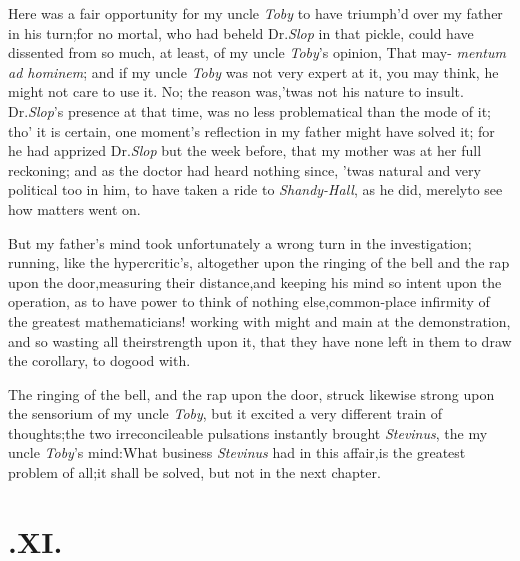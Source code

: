 \documentclass{article}
\begin{document}
Here was a fair opportunity for my uncle
\textit{Toby} to have triumph’d over my
father in his turn;\tsk for no mortal,
who had beheld Dr.\@ \textit{Slop} in
that pickle, could have dissented from
so much, at least, of my uncle
\textit{Toby}’s opinion, \lqq That may-\break
{}
\textit{mentum ad hominem}; and if my uncle
\textit{Toby} was not very expert at it,
you may think, he might not care to use
it.\tsk\break
No; the reason was,\tsk ’twas not his nature to insult.\\
\newpage
Dr.\@ \textit{Slop}’s presence at that time, was no less
problematical than the mode of it; tho’ it is certain, one
moment’s reflection in my father might have solved it; for he
had apprized Dr.\@ \textit{Slop} but the week before, that my mother was at her full reckoning;
and as the doctor had heard nothing since, ’twas natural and
very political too in him, to have taken a ride to
\textit{Shandy-Hall}, as he did, merely\break to see how matters went
on.

But my father’s mind took unfortunately a wrong turn in
the investigation; running, like the hypercritic’s,
altogether upon the ringing of the bell and the rap upon the
door,\tsk measuring their distance,\tsk and keeping his mind so
intent upon the operation, as to have power to think of nothing
else,\tsh common-place infirmity of the greatest
mathematicians! working with might and main at the
de\-monstration,
and so wasting all their\break strength upon it, that they have none left
in them to draw the corollary, to do\break good with.

The ringing of the bell, and the rap upon the door, struck
likewise strong\break
upon the sensorium of my uncle \textit{Toby},\tsk\break 
but it excited a very different train of
thoughts;\tsk the two irreconcileable pulsations instantly
brought \textit{Stevinus}, the\break
{}
my uncle \textit{Toby}’s mind:\tsk What business
\textit{Stevinus} had in this affair,\tsk is the greatest
problem of all;\tsh it shall be solved,\tsk\break
but not in the next chapter.

\vskip 30pt
\newpage

\null
\section{.\enspace  XI.}
\end{document}
